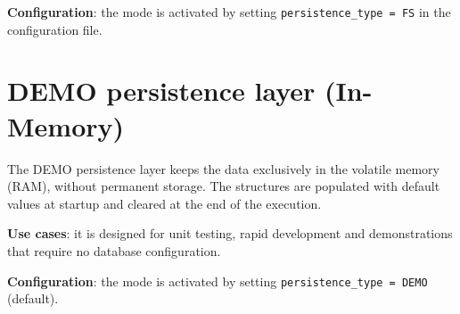 \textbf{Configuration}: the mode is activated by setting
\texttt{persistence\_type = FS} in the configuration file.

\section{DEMO persistence layer (In-Memory)}
The DEMO persistence layer keeps the data exclusively in the volatile memory
(RAM), without permanent storage. The structures are populated with default
values at startup and cleared at the end of the execution.

\textbf{Use cases}: it is designed for unit testing, rapid development and
demonstrations that require no database configuration.

\textbf{Configuration}: the mode is activated by setting
\texttt{persistence\_type = DEMO} (default).
